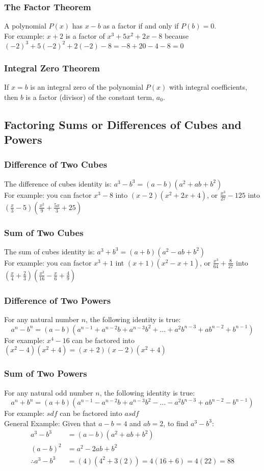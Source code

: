 \documentclass{article}
\begin{document}
	\subsubsection{The Factor Theorem}
	A polynomial $P(x)$ has $x-b$ as a factor if and only if $P(b)=0$.\\
	For example: $x+2$ is a factor of $x^3+5x^2+2x-8$ because $(-2)^3+5(-2)^2+2(-2)-8=-8+20-4-8=0$
	\subsubsection{Integral Zero Theorem}
	If $x=b$ is an integral zero of the polynomial $P(x)$ with integral coefficients, then $b$ is a factor (divisor) of the constant term, $a_0$.
	\subsection{Factoring Sums or Differences of Cubes and Powers}
	\subsubsection{Difference of Two Cubes}
	The difference of cubes identity is: $a^3-b^3=(a-b)(a^2+ab+b^2)$\\
	For example: you can factor $x^3-8$ into $(x-2)(x^2+2x+4)$, or $\frac{x^3}{27}-125$ into $(\frac{x}{3}-5)(\frac{x^2}{9}+\frac{5x}{3}+25)$
	\subsubsection{Sum of Two Cubes}
	The sum of cubes identity is: $a^3+b^3=(a+b)(a^2-ab+b^2)$\\
	For example: you can factor $x^3+1$ int $(x+1)(x^2-x+1)$, or $\frac{x^3}{64}+\frac{8}{27}$ into $(\frac{x}{4}+\frac{2}{3})(\frac{x^2}{16}-\frac{x}{6}+\frac{4}{9})$
	\subsubsection{Difference of Two Powers}
	For any natural number $n$, the following identity is true: \[a^n-b^n=(a-b)(a^{n-1}+a^{n-2}b+a^{n-3}b^2+\dots+a^2b^{n-3}+ab^{n-2}+b^{n-1})\]
	For example: $x^4-16$ can be factored into $(x^2-4)(x^2+4)=(x+2)(x-2)(x^2+4)$
	\subsubsection{Sum of Two Powers}
	For any natural odd number $n$, the following identity is true: \[a^n+b^n=(a+b)(a^{n-1}-a^{n-2}b+a^{n-3}b^2-\dots-a^2b^{n-3}+ab^{n-2}-b^{n-1})\]
	For example: $sdf$ can be factored into $asdf$
	\vspace{.5ex}\\
	General Example: Given that $a-b=4$ and $ab=2$, to find $a^3-b^3$:\\
	\begin{align*}
		a^3-b^3&=(a-b)(a^2+ab+b^2)\\
		(a-b)^2&=a^2-2ab+b^2\\
		\therefore a^3-b^3&=(4)(4^2+3(2))=4(16+6)=4(22)=88
	\end{align*}
	\vspace{-2ex}
	\setcounter{section}{4}
	\setcounter{subsection}{0}
\end{document}
